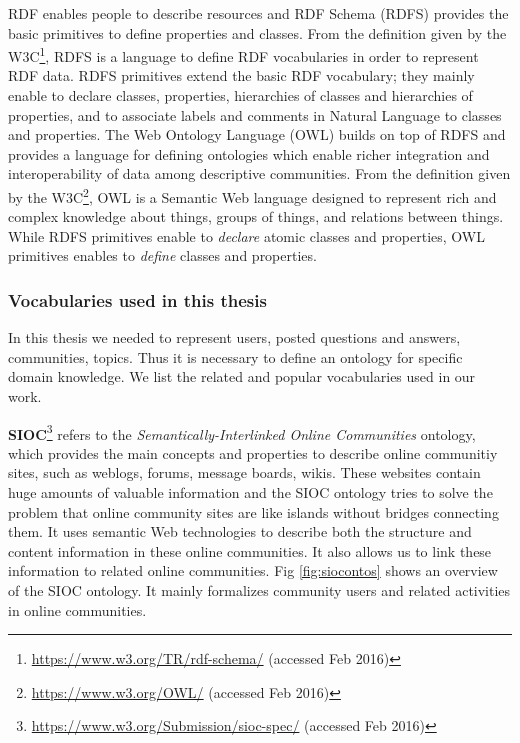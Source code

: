 RDF enables people to describe resources and RDF Schema (RDFS) provides the basic primitives to define properties and classes. From the definition given by the W3C\footnote{\url{https://www.w3.org/TR/rdf-schema/} (accessed Feb 2016)}, RDFS is a language to define RDF vocabularies in order to represent RDF data. RDFS primitives extend the basic RDF vocabulary; they mainly enable to declare classes, properties, hierarchies of classes and hierarchies of properties, and to associate labels and comments in Natural Language to classes and properties. 
The Web Ontology Language (OWL) builds on top of RDFS and provides a language for defining ontologies which enable richer integration and interoperability of data among descriptive communities. From the definition given by the W3C\footnote{\url{https://www.w3.org/OWL/} (accessed Feb 2016)}, OWL is a Semantic Web language designed to represent rich and complex knowledge about things, groups of things, and relations between things. While RDFS primitives enable to \textit{declare} atomic classes and properties, OWL primitives enables to  \textit{define} classes and properties. 


\subsubsection{Vocabularies used in this thesis}
In this thesis we needed to represent users, posted questions and answers, communities, topics. Thus it is necessary to define an ontology for specific domain knowledge. We list the related and popular vocabularies used in our work.


\textbf{SIOC}\footnote{\url{https://www.w3.org/Submission/sioc-spec/} (accessed Feb 2016)} refers to the \textit{Semantically-Interlinked Online Communities} ontology, which provides the main concepts and properties to describe online communitiy sites, such as weblogs, forums, message boards, wikis. These websites contain huge amounts of valuable information and the SIOC ontology tries to solve the problem that online community sites are like islands without bridges connecting them. It uses semantic Web technologies to describe both the structure and content information in these online communities. It also allows us to link these information to related online communities. Fig \ref{fig:siocontos} shows an overview of the SIOC ontology. It mainly formalizes community users and related activities in online communities.
 
